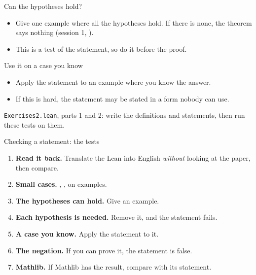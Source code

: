 \documentclass[10pt, aspectratio=169]{beamer}
\begin{document}
\begin{frame}[fragile]{Can the hypotheses hold?}

\vspace{0.4em}
\begin{itemize}
\item Give one example where all the hypotheses hold. If there is none, the theorem says nothing (session 1, ).
\item This is a test of the statement, so do it before the proof.
\end{itemize}
\end{frame}

\begin{frame}[fragile]{Use it on a case you know}

\vspace{0.4em}
\begin{itemize}
\item Apply the statement to an example where you know the answer.
\item If this is hard, the statement may be stated in a form nobody can use.
\end{itemize}

\vspace{0.6em}
\begin{athome}
\texttt{Exercises2.lean}, parts 1 and 2: write the definitions and statements, then run these tests on them.
\end{athome}
\end{frame}

\begin{frame}[fragile]{Checking a statement: the tests}
\begin{enumerate}
\item \textbf{Read it back.} Translate the Lean into English \emph{without} looking at the paper, then compare.
\item \textbf{Small cases.} , ,  on examples.
\item \textbf{The hypotheses can hold.} Give an example.
\item \textbf{Each hypothesis is needed.} Remove it, and the statement fails.
\item \textbf{A case you know.} Apply the statement to it.
\item \textbf{The negation.} If you can prove it, the statement is false.
\item \textbf{Mathlib.} If Mathlib has the result, compare with its statement.
\end{enumerate}
\end{frame}
\end{document}
